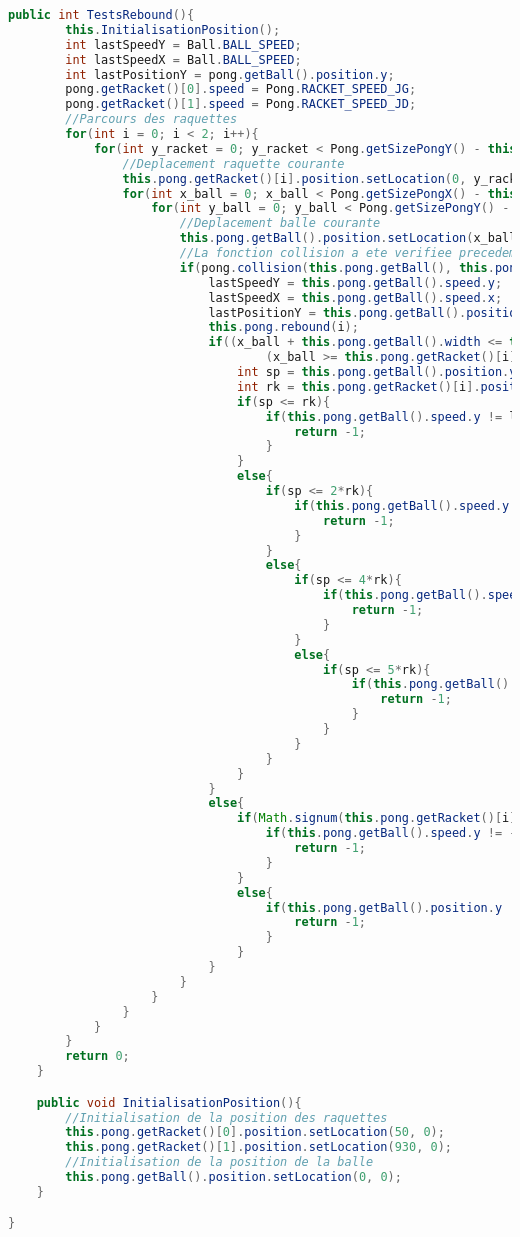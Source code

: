 \begin{lstlisting}[language=Java]
	public int TestsRebound(){
		this.InitialisationPosition();
		int lastSpeedY = Ball.BALL_SPEED;
		int lastSpeedX = Ball.BALL_SPEED;
		int lastPositionY = pong.getBall().position.y;
		pong.getRacket()[0].speed = Pong.RACKET_SPEED_JG;
		pong.getRacket()[1].speed = Pong.RACKET_SPEED_JD;
		//Parcours des raquettes
		for(int i = 0; i < 2; i++){
			for(int y_racket = 0; y_racket < Pong.getSizePongY() - this.pong.getRacket()[0].height; y_racket++){
				//Deplacement raquette courante
				this.pong.getRacket()[i].position.setLocation(0, y_racket);
				for(int x_ball = 0; x_ball < Pong.getSizePongX() - this.pong.getBall().width; x_ball++){
					for(int y_ball = 0; y_ball < Pong.getSizePongY() - this.pong.getBall().height; y_ball++){					
						//Deplacement balle courante
						this.pong.getBall().position.setLocation(x_ball, y_ball);
						//La fonction collision a ete verifiee precedemment et est donc utilisable
						if(pong.collision(this.pong.getBall(), this.pong.getRacket()[i])){
							lastSpeedY = this.pong.getBall().speed.y;
							lastSpeedX = this.pong.getBall().speed.x;
							lastPositionY = this.pong.getBall().position.y;
							this.pong.rebound(i);
							if((x_ball + this.pong.getBall().width <= this.pong.getRacket()[i].position.x) ||
									(x_ball >= this.pong.getRacket()[i].position.x + this.pong.getRacket()[i].width) ){
								int sp = this.pong.getBall().position.y + this.pong.getBall().height/2;
								int rk = this.pong.getRacket()[i].position.y + this.pong.getRacket()[i].height/5;       
								if(sp <= rk){
									if(this.pong.getBall().speed.y != lastSpeedY - 1 && this.pong.getBall().speed.x != - lastSpeedX){
										return -1;
									}
								}
								else{
									if(sp <= 2*rk){
										if(this.pong.getBall().speed.y != lastSpeedY - 1/2 && this.pong.getBall().speed.x != - lastSpeedX){
											return -1;
										}
									}
									else{
										if(sp <= 4*rk){
											if(this.pong.getBall().speed.y != lastSpeedY + 1/2 && this.pong.getBall().speed.x != - lastSpeedX){
												return -1;
											}
										}
										else{
											if(sp <= 5*rk){
												if(this.pong.getBall().speed.y != lastSpeedY + 1 && this.pong.getBall().speed.x != - lastSpeedX){
													return -1;
												}
											}
										}
									}
								}
							}
							else{
								if(Math.signum(this.pong.getRacket()[i].speed) != Math.signum(this.pong.getBall().speed.y)){
									if(this.pong.getBall().speed.y != -lastSpeedY){
										return -1;
									}
								}
								else{
									if(this.pong.getBall().position.y != lastPositionY + this.pong.getBall().speed.y){
										return -1;
									}
								}
							}
						}
					}
				}
			}
		}
		return 0;
	}

	public void InitialisationPosition(){
		//Initialisation de la position des raquettes 
		this.pong.getRacket()[0].position.setLocation(50, 0);
		this.pong.getRacket()[1].position.setLocation(930, 0);
		//Initialisation de la position de la balle
		this.pong.getBall().position.setLocation(0, 0);
	}

}

\end{lstlisting}